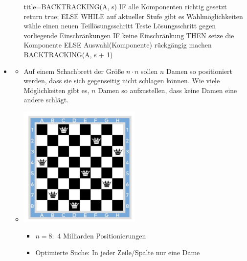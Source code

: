 \documentclass[
    12pt,
    a4paper,
    ngerman,
    color=3b,%
    marginpar=false,
    colorback=false,
    leqno,
]{tudaexercise}
\begin{document}
\begin{itemize}
\begin{itemize}
                    \begin{ccode}[autogobble]{title={BACKTRACKING(A, s)}}
                    IF alle Komponenten richtig gesetzt
                        return true;
                    ELSE
                        WHILE auf aktueller Stufe gibt es Wahlmöglichkeiten
                            wähle einen neuen Teillösungsschritt
                            Teste Lösungsschritt gegen vorliegende Einschränkungen
                            IF keine Einschränkung THEN
                                setze die Komponente
                            ELSE
                                Auswahl(Komponente) rückgängig machen
                            BACKTRACKING(A, s + 1)
                    \end{ccode}
            \end{itemize}
\clearpage
        \item {}
            \begin{itemize}
                \item[]
                    Auf einem Schachbrett der Größe $n \cdot n$ sollen $n$ Damen so positioniert werden, dass sie sich 
                    gegenseitig nicht schlagen können. Wie viele Möglichkeiten gibt es, $n$ Damen so aufzustellen, dass keine
                    Damen eine andere schlägt.
                \item[]
                    \begin{minipage}{0.3\textwidth}
                        \includegraphics[width=6cm]{pictures/damenproblem.PNG}
                    \end{minipage}
                    \begin{minipage}{0.6\textwidth}
                        \begin{itemize}
                            \item $n=8:$ 4 Milliarden Positionierungen
                            \item Optimierte Suche: In jeder Zeile/Spalte nur eine Dame

\end{itemize}
\end{minipage}
\end{itemize}
\end{itemize}
\end{document}
